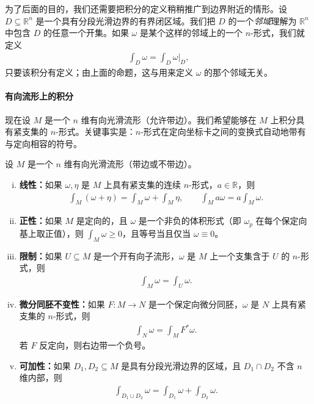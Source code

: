 \documentclass[../../main.tex]{subfiles}
\begin{document}
为了后面的目的，我们还需要把积分的定义稍稍推广到边界附近的情形。设 $D\subseteq\mathbb{R}^n$ 是一个具有分段光滑边界的有界闭区域。我们把 $D$ 的一个\emph{邻域}理解为 $\mathbb{R}^n$ 中包含 $D$ 的任意一个开集。如果 $\omega$ 是某个这样的邻域上的一个 $n$-形式，我们就定义
\begin{align*}
\int_D\omega=\int_D\omega|_D,
\end{align*}
只要该积分有定义；由上面的命题，这与用来定义 $\omega$ 的那个邻域无关。

\paragraph{有向流形上的积分}
现在设 $M$ 是一个 $n$ 维有向光滑流形（允许带边）。我们希望能够在 $M$ 上积分具有紧支集的 $n$-形式。关键事实是：$n$-形式在定向坐标卡之间的变换式自动地带有与定向相容的符号。

\begin{proposition}[形式积分的性质]\label{proposition:ch16-properties-of-form-integration}
设 $M$ 是一个 $n$ 维有向光滑流形（带边或不带边）。
\begin{enumerate}[(i)]
\item \textbf{线性：}如果 $\omega,\eta$ 是 $M$ 上具有紧支集的连续 $n$-形式，$a\in\mathbb{R}$，则
\begin{align*}
\int_M(\omega+\eta)=\int_M\omega+\int_M\eta,\qquad
\int_M a\omega=a\int_M\omega.
\end{align*}
\item \textbf{正性：}如果 $M$ 是定向的，且 $\omega$ 是一个非负的体积形式（即 $\omega_p$ 在每个保定向基上取正值），则 $\int_M\omega\geqslant0$，且等号当且仅当 $\omega\equiv0$。
\item \textbf{限制：}如果 $U\subseteq M$ 是一个开有向子流形，$\omega$ 是 $M$ 上一个支集含于 $U$ 的 $n$-形式，则
\begin{align*}
\int_M\omega=\int_U\omega.
\end{align*}
\item \textbf{微分同胚不变性：}如果 $F:M\to N$ 是一个保定向微分同胚，$\omega$ 是 $N$ 上具有紧支集的 $n$-形式，则
\begin{align*}
\int_N\omega=\int_M F^*\omega.
\end{align*}
若 $F$ 反定向，则右边带一个负号。
\item \textbf{可加性：}如果 $D_1,D_2\subseteq M$ 是具有分段光滑边界的区域，且 $D_1\cap D_2$ 不含 $n$ 维内部，则
\begin{align*}
\int_{D_1\cup D_2}\omega=\int_{D_1}\omega+\int_{D_2}\omega.
\end{align*}
\end{enumerate}
\end{proposition}
\end{document}
